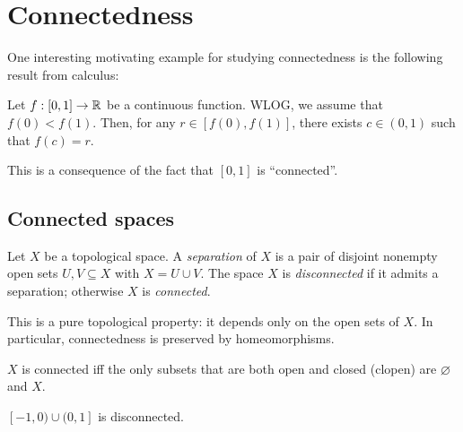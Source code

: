 \section{Connectedness}

One interesting motivating example for studying connectedness is the following result from calculus:

\begin{theorem}
    Let $f:[0,1]\to\mathbb{R}$ be a continuous function. WLOG, we assume that $f(0)<f(1)$. Then, for any $r\in [f(0),f(1)]$, there exists $c\in (0,1)$ such that $f(c)=r$.
\end{theorem}

This is a consequence of the fact that $[0,1]$ is ``connected''.



\subsection{Connected spaces}


\begin{definition}
Let $X$ be a topological space. A \emph{separation} of $X$ is a pair of disjoint nonempty open sets $U,V\subseteq X$ with $X=U\cup V$. The space $X$ is \emph{disconnected} if it admits a separation; otherwise $X$ is \emph{connected}.
\end{definition}

\begin{remark}
    This is a pure topological property: it depends only on the open sets of $X$. In particular, connectedness is preserved by homeomorphisms.
\end{remark}

\begin{remark}
    $X$ is connected iff the only subsets that are both open and closed (clopen) are $\varnothing$ and $X$.
\end{remark}



\begin{example}
    $[-1,0)\cup (0,1]$ is disconnected.
\end{example}


